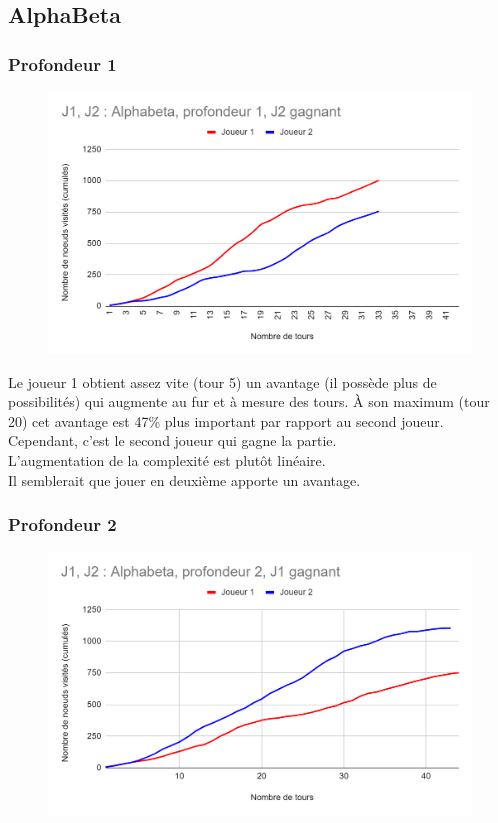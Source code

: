 \documentclass[12pt]{article}
\begin{document}
\subsection{AlphaBeta}

\subsubsection{Profondeur 1}

\begin{figure}[!h]
   \includegraphics[width=\textwidth]{prof1alphabeta.png}
\end{figure}

Le joueur 1 obtient assez vite (tour 5) un avantage (il possède plus de possibilités) qui augmente au fur et à mesure des tours. À son maximum (tour 20) cet avantage est 47\% plus important par rapport au second joueur.\\
Cependant, c'est le second joueur qui gagne la partie.\\

L’augmentation de la complexité est plutôt linéaire.\\
Il semblerait que jouer en deuxième apporte un avantage.
\newpage
\subsubsection{Profondeur 2}

\begin{figure}[!h]
   \includegraphics[width=\textwidth]{prof2alphabeta.png}
\end{figure}
\end{document}
